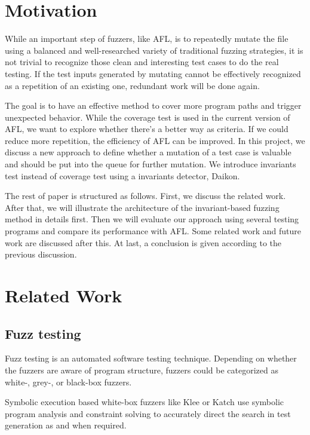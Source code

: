 \documentclass[sigplan,10pt,review = false]{acmart}\settopmatter{printfolios=true,printccs=false,printacmref=false}
\begin{document}
\section{Motivation}

While an important step of fuzzers, like AFL, is to repeatedly mutate the file using a balanced and well-researched variety of traditional fuzzing strategies, it is not trivial to recognize those clean and interesting test cases to do the real testing. If the test inputs generated by mutating cannot be effectively recognized as a repetition of an existing one, redundant work will be done again. 

The goal is to have an effective method to cover more program paths and trigger unexpected behavior. While the coverage test is used in the current version of AFL, we want to explore whether there's a better way as criteria. If we could reduce more repetition, the efficiency of AFL can be improved. In this project, we discuss a new approach to define whether a mutation of a test case is valuable and should be put into the queue for further mutation. We introduce invariants test instead of coverage test using a invariants detector, Daikon\cite{ernst2001dynamically}. 

The rest of paper is structured as follows. First, we discuss the related work. After that, we will illustrate the architecture of the invariant-based fuzzing method in details first. Then we will evaluate our approach using several testing programs and compare its performance with AFL. Some related work and future work are discussed after this. At last, a conclusion is given according to the previous discussion.

\section{Related Work}
\subsection{Fuzz testing}
Fuzz testing is an automated software testing technique. Depending on whether the fuzzers are aware of program structure, fuzzers could be categorized as white-, grey-, or black-box fuzzers.

Symbolic execution based white-box fuzzers like Klee\cite{cadar2008klee} or Katch\cite{marinescu2013katch} use symbolic program analysis and constraint solving to accurately direct the search in test generation as and when required.
\end{document}
